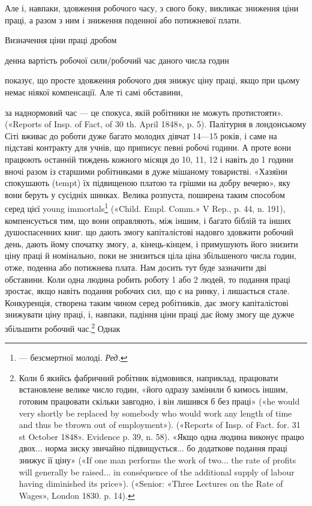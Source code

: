 Але і, навпаки, здовження робочого часу, з свого боку, викликає
зниження ціни праці, а разом з ним і зниження поденної
або потижневої плати.

Визначення ціни праці дробом

денна вартість робочої сили/робочий час даного числа годин

показує, що просте здовження робочого дня знижує ціну праці,
якщо при цьому немає ніякої компенсації. Але ті самі обставини,

за наднормовий час — це спокуса, якій робітники не можуть протистояти».
(«Reports of Insp. of Fact, of 30 th. April 1848», p. 5). Палітурня
в лондонському Сіті вживає до роботи дуже багато молодих дівчат
14—15 років, і саме на підставі контракту для учнів, що приписує певні
робочі години. А проте вони працюють останній тиждень кожного місяця
до 10, 11, 12 і навіть до 1 години вночі разом із старшими робітниками
в дуже мішаному товаристві. «Хазяїни спокушають (tempt) їх підвищеною
платою та грішми на добру вечерю», яку вони беруть у сусідніх
шинках. Велика розпуста, поширена таким способом серед цієї
young immortals\footnote*{
— безсмертної молоді. \emph{Ред.}
} («Child. Empl. Comm.» V Rep., p. 44, n. 191), компенсується
тим, що вони оправляють, між іншим, і багато біблій та інших
душоспасенних книг.
що дають змогу капіталістові надовго здовжити робочий день,
дають йому спочатку змогу, а, кінець-кінцем, і примушують
його знизити ціну праці й номінально, поки не знизиться ціла ціна
збільшеного числа годин, отже, поденна або потижнева плата.
Нам досить тут буде зазначити дві обставини. Коли одна людина
робить роботу 1 або 2 людей, то подання праці зростає, якщо
навіть подання робочих сил, що є на ринку, і лишається стале.
Конкуренція, створена таким чином серед робітників, дає змогу
капіталістові знижувати ціну праці, і, навпаки, падіння ціни
праці дає йому змогу ще дужче збільшити робочий час.\footnote{
Коли б якийсь фабричний робітник відмовився, наприклад, працювати
встановлене велике число годин, «його одразу замінили б кимось
іншим, готовим працювати скільки завгодно, і він лишився б без праці»
(«he would very shortly be replaced by somebody who would work any
length of time and thus be tbrown out of employment»). («Reports of Insp.
of Fact. for. 31 st October 1848». Evidence p. 39, n. 58). «Якщо одна людина
виконує працю двох... норма зиску звичайно підвищується... бо додаткове
подання праці знижує її ціну» («If one man performs the work of
two... the rate of profits will generally be raised... in conséquence of the
additional supply of labour having diminished its price»). («Senior:
«Three Lectures on the Rate of Wages», London 1830. p. 14).
} Однак
